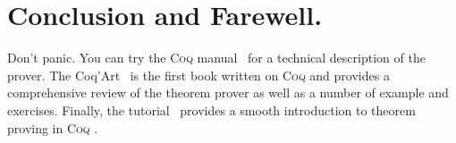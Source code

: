 \documentclass[a4paper]{faq}
\def\Coq{\textsc{Coq }}
\begin{document}








\section{Conclusion and Farewell.}
\label{ccl}

\label{lastquestion}

Don't panic. You can try the \Coq manual~\cite{Coq:e} for a technical
description of the prover. The Coq'Art~\cite{Coq:coqart} is the first
book written on \Coq and provides a comprehensive review of the
theorem prover as well as a number of example and exercises. Finally,
the tutorial~\cite{Coq:Tutorial} provides a smooth introduction to
theorem proving in \Coq.

\newpage
\nocite{LaTeX:intro}
\nocite{LaTeX:symb}



\end{document}
